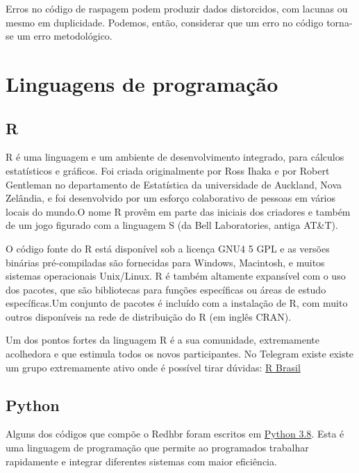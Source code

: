 \documentclass[
]{book}
\begin{document}
Erros no código de raspagem podem produzir dados distorcidos, com lacunas ou mesmo em duplicidade. Podemos, então, considerar que um erro no código torna-se um erro metodológico.

\hypertarget{linguagens-de-programauxe7uxe3o}{%
\chapter{Linguagens de programação}\label{linguagens-de-programauxe7uxe3o}}

\hypertarget{r}{%
\section{R}\label{r}}

R é uma linguagem e um ambiente de desenvolvimento integrado, para cálculos estatísticos e gráficos. Foi criada originalmente por Ross Ihaka e por Robert Gentleman no departamento de Estatística da universidade de Auckland, Nova Zelândia, e foi desenvolvido por um esforço colaborativo de pessoas em vários locais do mundo.O nome R provêm em parte das iniciais dos criadores e também de um jogo figurado com a linguagem S (da Bell Laboratories, antiga AT\&T).

O código fonte do R está disponível sob a licença GNU4 5 GPL e as versões binárias pré-compiladas são fornecidas para Windows, Macintosh, e muitos sistemas operacionais Unix/Linux. R é também altamente expansível com o uso dos pacotes, que são bibliotecas para funções específicas ou áreas de estudo específicas.Um conjunto de pacotes é incluído com a instalação de R, com muito outros disponíveis na rede de distribuição do R (em inglês CRAN).

Um dos pontos fortes da linguagem R é a sua comunidade, extremamente acolhedora e que estimula todos os novos participantes. No Telegram existe existe um grupo extremamente ativo onde é possível tirar dúvidas: \href{https://t.me/rbrasiloficial}{R Brasil}

\hypertarget{python}{%
\section{Python}\label{python}}

Alguns dos códigos que compõe o Redhbr foram escritos em \href{https://www.python.org/}{Python 3.8}. Esta é uma linguagem de programação que permite ao programados trabalhar rapidamente e integrar diferentes sistemas com maior eficiência.
\end{document}
